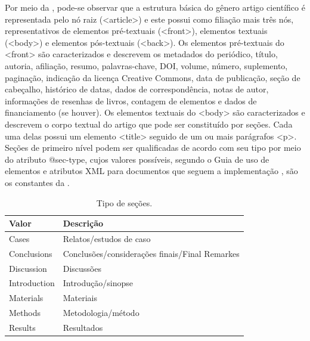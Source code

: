\documentclass[portuguese]{textolivre}
\begin{document}
Por meio da , pode-se observar que a estrutura básica do gênero artigo científico é representada pelo nó raiz (<article>) e este possui como filiação mais três nós, representativos de elementos pré-textuais (<front>), elementos textuais (<body>) e elementos pós-textuais (<back>).  Os elementos pré-textuais do <front> são caracterizados e descrevem os metadados do periódico, título, autoria, afiliação, resumo, palavras-chave, DOI, volume, número, suplemento, paginação, indicação da licença Creative Commons, data de publicação, seção de cabeçalho, histórico de datas, dados de correspondência, notas de autor, informações de resenhas de livros, contagem de elementos e dados de financiamento (se houver). Os elementos textuais do <body> são caracterizados e descrevem o corpo textual do artigo que pode ser constituído por seções. Cada uma delas possui um elemento <title> seguido de um ou mais parágrafos <p>. Seções de primeiro nível podem ser qualificadas de acordo com seu tipo por meio do atributo @sec-type, cujos valores possíveis, segundo o Guia de uso de elementos e atributos XML para documentos que seguem a implementação \textcite{Scielo}, são os constantes da .

\begin{table}[htbp]
\begin{center}
\caption{Tipo de seções.}
\label{tbl02}
\begin{tabular}{ll}
\hline 
\textbf{Valor}        & \textbf{Descrição}                                    \\
\hline
Cases        & Relatos/estudos de caso                             \\
Conclusions  & Conclusões/considerações finais/Final Remarkes \\
Discussion   & Discussões                                    \\
Introduction & Introdução/sinopse                          \\
Materials    & Materiais                                 \\
Methods      & Metodologia/método                           \\
Results      & Resultados                                        \\ \hline
\end{tabular}
\end{center}
\end{table}
\end{document}

